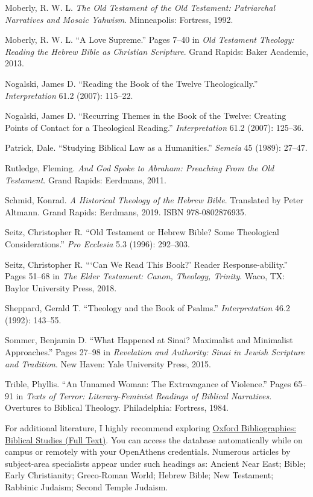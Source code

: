 \documentclass[titlepage]{article}
\begin{document}
\begin{thebibliography}{99}
 Moberly, R. W. L. \emph{The Old Testament of the Old Testament: Patriarchal Narratives and Mosaic Yahwism}. Minneapolis: Fortress, 1992.

 Moberly, R. W. L. “A Love Supreme.” Pages 7–40 in \emph{Old Testament Theology: Reading the Hebrew Bible as Christian Scripture}. Grand Rapids: Baker Academic, 2013.

 Nogalski, James D. “Reading the Book of the Twelve Theologically.” \emph{Interpretation} 61.2 (2007): 115–22.

 Nogalski, James D. “Recurring Themes in the Book of the Twelve: Creating Points of Contact for a Theological Reading.” \emph{Interpretation} 61.2 (2007): 125–36.

 Patrick, Dale. “Studying Biblical Law as a Humanities.” \emph{Semeia} 45 (1989): 27–47.

 Rutledge, Fleming. \emph{And God Spoke to Abraham: Preaching From the Old Testament}. Grand Rapids: Eerdmans, 2011.

 Schmid, Konrad. \emph{A Historical Theology of the Hebrew Bible}. Translated by Peter Altmann. Grand Rapids: Eerdmans, 2019. ISBN 978-0802876935.

 Seitz, Christopher R. “Old Testament or Hebrew Bible? Some Theological Considerations.” \emph{Pro Ecclesia} 5.3 (1996): 292–303.

 Seitz, Christopher R. “‘Can We Read This Book?’ Reader Response-ability.” Pages 51–68 in \emph{The Elder Testament: Canon, Theology, Trinity}. Waco, TX: Baylor University Press, 2018.

 Sheppard, Gerald T. “Theology and the Book of Psalms.” \emph{Interpretation} 46.2 (1992): 143–55.

 Sommer, Benjamin D. “What Happened at Sinai? Maximalist and Minimalist Approaches.” Pages 27–98 in \emph{Revelation and Authority: Sinai in Jewish Scripture and Tradition}. New Haven: Yale University Press, 2015.

 Trible, Phyllis. “An Unnamed Woman: The Extravagance of Violence.” Pages 65–91 in \emph{Texts of Terror: Literary-Feminist Readings of Biblical Narratives}. Overtures to Biblical Theology. Philadelphia: Fortress, 1984.

\end{thebibliography}
\endgroup

For additional literature, I highly recommend exploring \href{https://go.openathens.net/redirector/astheology.ns.ca?url=https://www.oxfordbibliographies.com/obo/page/biblical-studies}{Oxford Bibliographies: Biblical Studies (Full Text)}.
You can access the database automatically while on campus or remotely with your
OpenAthens credentials. Numerous articles by subject-area specialists appear
under such headings as: Ancient Near East; Bible; Early Christianity;
Greco-Roman World; Hebrew Bible; New Testament; Rabbinic Judaism; Second Temple
Judaism.
\end{document}
